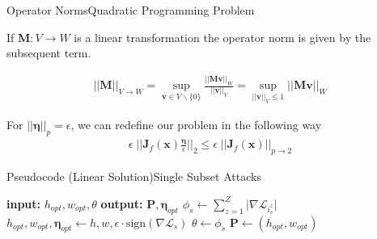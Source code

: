 \documentclass[xcolor={cmyk}]{beamer}
\newcommand{\mcl}{\mathcal}
\newcommand{\bm}{\boldsymbol}
\begin{document}
\begin{frame}{Operator Norms}{Quadratic Programming Problem}

If $\bm{M}: V \rightarrow W$ is a linear transformation the operator norm is given by the subsequent term.

\begin{equation*}
\begin{aligned}
	\lvert\lvert \bm{M} \rvert\rvert_{V \rightarrow W} = \sup_{\bm{v} \in V \backslash \{0\}} \frac{\lvert\lvert \bm{M v} \rvert\rvert_W}{\lvert\lvert \bm{v} \rvert\rvert_V} = \sup_{\lvert\lvert \bm{v} \rvert\rvert_V \leq 1} \lvert\lvert \bm{M v}  \rvert\rvert_W
\end{aligned}
\end{equation*}

For $\lvert\lvert \bm{\eta} \rvert\rvert_p = \epsilon$, we can redefine our problem in the following way \\[20pt]

\begin{equation*}
\begin{aligned}
	\epsilon \; \lvert\lvert \bm{J}_f(\bm{x}) \frac{\bm{\eta}}{\epsilon} \rvert\rvert_2 \leq \epsilon \; \lvert\lvert \bm{J}_f(\bm{x}) \rvert\rvert_{p \rightarrow 2}
\end{aligned}
\end{equation*}

\end{frame}


\begin{frame}{Pseudocode (Linear Solution)}{Single Subset Attacks}

	\begin{algorithm}[H]
	\caption{Single Subset Attack (Linear Solution)}
	\label{alg:single_linear}
	\begin{algorithmic}[1]
	\STATE \textbf{input:} $h_{opt}, w_{opt}, \theta$
	\STATE \textbf{output:} $\bm{P}, \bm{\eta}_{opt}$
			\STATE $\phi_s \gets \sum_{z=1}^Z \lvert \nabla \mcl{L}_{i_s^z} \rvert$
			\IF{$\phi_s > \theta \; and \; (h, w) \not\in \bm{P}$}
				\STATE $h_{opt}, w_{opt}, \bm{\eta}_{opt} \gets h, w, \epsilon \cdot \text{sign}(\nabla \mcl{L}_s)$
				\STATE $\theta \gets \phi_s$
			\ENDIF
		\ENDFOR
	\ENDFOR
	\STATE $\bm{P} \gets (h_{opt}, w_{opt})$
	\end{algorithmic}
	\end{algorithm}

\end{frame}
\end{document}
